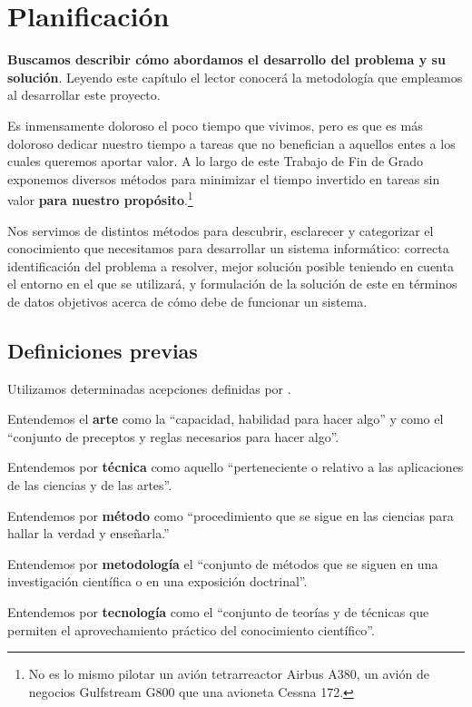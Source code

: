 \chapter{Planificación}

\textbf{Buscamos describir cómo abordamos el desarrollo del problema y su solución}.
Leyendo este capítulo el lector conocerá la metodología que empleamos al desarrollar este
proyecto.

Es inmensamente doloroso el poco tiempo que vivimos, pero es que es más doloroso dedicar
nuestro tiempo a tareas que no benefician a aquellos entes a los cuales queremos aportar
valor.
A lo largo de este Trabajo de Fin de Grado exponemos diversos métodos para minimizar
el tiempo invertido en tareas sin valor \textbf{para nuestro propósito}.\footnote{%
    No es lo mismo pilotar un avión tetrarreactor Airbus A380,
    un avión de negocios Gulfstream G800 que una avioneta Cessna 172.
}

Nos servimos de distintos métodos para descubrir, esclarecer y categorizar el conocimiento que necesitamos
para desarrollar un sistema informático: correcta identificación del problema a resolver,
mejor solución posible teniendo en cuenta el entorno en el que se utilizará,
y formulación de la solución de este en términos de datos objetivos acerca de cómo debe de
funcionar un sistema.

\section{Definiciones previas}

Utilizamos determinadas acepciones definidas por \cite{RAE_DLE}.

Entendemos el \textbf{arte} como la ``capacidad, habilidad para hacer algo'' y como
el ``conjunto de preceptos y reglas necesarios para hacer algo''.

Entendemos por \textbf{técnica} como aquello ``perteneciente o relativo a las
aplicaciones de las ciencias y de las artes''.

Entendemos por \textbf{método} como ``procedimiento que se sigue en las ciencias
para hallar la verdad y enseñarla.''

Entendemos por \textbf{metodología} el ``conjunto de métodos que se siguen en una investigación
científica o en una exposición doctrinal''.

Entendemos por \textbf{tecnología} como el ``conjunto de teorías y de técnicas que permiten el
aprovechamiento práctico del conocimiento científico''.

